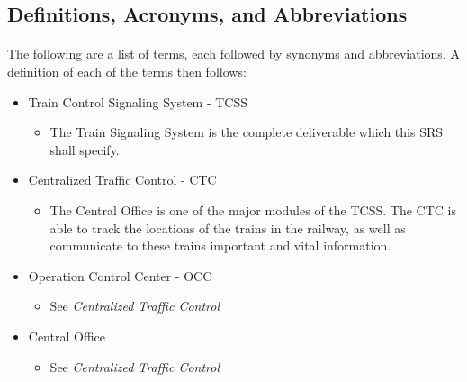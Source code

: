 \documentclass{article}
\begin{document}
    \subsection{Definitions, Acronyms, and Abbreviations}
    \paragraph{} The following are a list of terms, each followed by synonyms and abbreviations. A definition of each of the terms then follows:
    \begin{itemize}
        \item Train Control Signaling System - TCSS
            \begin{itemize}
            \item The Train Signaling System is the complete deliverable which this SRS shall specify.
            \end{itemize}
        \item Centralized Traffic Control - CTC
            \begin{itemize}
            \item The Central Office is one of the major modules of the TCSS. The CTC is able to track the locations of the trains in the railway, as well as communicate to these trains important and vital information.
            \end{itemize}
        \item Operation Control Center - OCC
            \begin{itemize}
            \item See \emph{Centralized Traffic Control}
            \end{itemize}
        \item Central Office
            \begin{itemize}
            \item See \emph{Centralized Traffic Control}
            \end{itemize}


\end{itemize}
\end{document}
